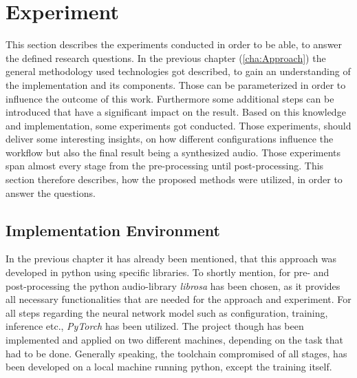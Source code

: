 \chapter{Experiment}
\label{cha:Experiment}
This section describes the experiments conducted in order to be able, to answer the defined research questions. In the previous chapter (\ref{cha:Approach}) the general methodology used technologies got described, to gain an understanding of the implementation and its components. Those can be parameterized in order to influence the outcome of this work. Furthermore some additional steps can be introduced that have a significant impact on the result. Based on this knowledge and implementation, some experiments got conducted. Those experiments, should deliver some interesting insights, on how different configurations influence the workflow but also the final result being a synthesized audio. Those experiments span almost every stage from the pre-processing until post-processing. This section therefore describes, how the proposed methods were utilized, in order to answer the questions. \\







\section{Implementation Environment}
In the previous chapter it has already been mentioned, that this approach was developed in python using specific libraries. To shortly mention, for pre- and post-processing the python audio-library \textit{librosa}\cite{brian_mcfee_2022_6097378} has been chosen, as it provides all necessary functionalities that are needed for the approach and experiment. For all steps regarding the neural network model such as configuration, training, inference etc., \textit{PyTorch}\cite{paszke2019pytorch} has been utilized. The project though has been implemented and applied on two different machines, depending on the task that had to be done. Generally speaking, the toolchain compromised of all stages, has been developed on a local machine running python, except the training itself. 

